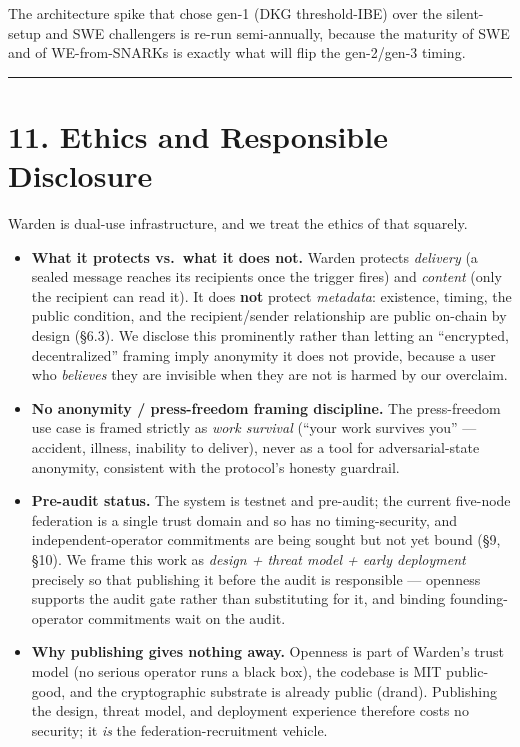 \documentclass[
  11pt,
]{article}
\providecommand{\tightlist}{%
  \setlength{\itemsep}{0pt}\setlength{\parskip}{0pt}}
\begin{document}
The architecture spike that chose gen-1 (DKG threshold-IBE) over the
silent-setup and SWE challengers is re-run semi-annually, because the
maturity of SWE and of WE-from-SNARKs is exactly what will flip the
gen-2/gen-3 timing.

\begin{center}\rule{0.5\linewidth}{0.5pt}\end{center}

\section{11. Ethics and Responsible
Disclosure}\label{ethics-and-responsible-disclosure}

Warden is dual-use infrastructure, and we treat the ethics of that
squarely.

\begin{itemize}
\tightlist
\item
  \textbf{What it protects vs.~what it does not.} Warden protects
  \emph{delivery} (a sealed message reaches its recipients once the
  trigger fires) and \emph{content} (only the recipient can read it). It
  does \textbf{not} protect \emph{metadata}: existence, timing, the
  public condition, and the recipient/sender relationship are public
  on-chain by design (§6.3). We disclose this prominently rather than
  letting an ``encrypted, decentralized'' framing imply anonymity it
  does not provide, because a user who \emph{believes} they are
  invisible when they are not is harmed by our overclaim.
\item
  \textbf{No anonymity / press-freedom framing discipline.} The
  press-freedom use case is framed strictly as \emph{work survival}
  (``your work survives you'' --- accident, illness, inability to
  deliver), never as a tool for adversarial-state anonymity, consistent
  with the protocol's honesty guardrail.
\item
  \textbf{Pre-audit status.} The system is testnet and pre-audit; the
  current five-node federation is a single trust domain and so has no
  timing-security, and independent-operator commitments are being sought
  but not yet bound (§9, §10). We frame this work as \emph{design +
  threat model + early deployment} precisely so that publishing it
  before the audit is responsible --- openness supports the audit gate
  rather than substituting for it, and binding founding-operator
  commitments wait on the audit.
\item
  \textbf{Why publishing gives nothing away.} Openness is part of
  Warden's trust model (no serious operator runs a black box), the
  codebase is MIT public-good, and the cryptographic substrate is
  already public (drand). Publishing the design, threat model, and
  deployment experience therefore costs no security; it \emph{is} the
  federation-recruitment vehicle.
\end{itemize}
\end{document}
